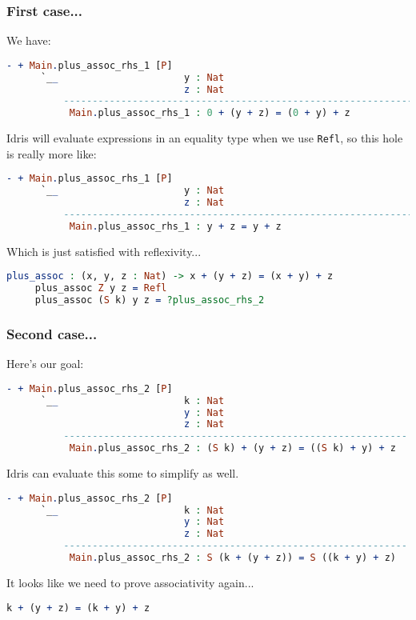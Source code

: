 \documentclass{beamer}
\begin{document}
\begin{frame}[fragile]
  \frametitle{First case...}

  We have:

  \begin{lstlisting}[language=Idris]
     - + Main.plus_assoc_rhs_1 [P]
      `__                      y : Nat
                               z : Nat
          ---------------------------------------------------------------
           Main.plus_assoc_rhs_1 : 0 + (y + z) = (0 + y) + z
  \end{lstlisting}

  \pause
  Idris will evaluate expressions in an equality type when we use
  \texttt{Refl}, so this hole is really more like:

  \begin{lstlisting}[language=Idris]
     - + Main.plus_assoc_rhs_1 [P]
      `__                      y : Nat
                               z : Nat
          ---------------------------------------------------------------
           Main.plus_assoc_rhs_1 : y + z = y + z
  \end{lstlisting}

  \pause
  Which is just satisfied with reflexivity...

  \begin{lstlisting}[language=Idris]
     plus_assoc : (x, y, z : Nat) -> x + (y + z) = (x + y) + z
     plus_assoc Z y z = Refl
     plus_assoc (S k) y z = ?plus_assoc_rhs_2
  \end{lstlisting}
\end{frame}

\begin{frame}[fragile]
  \frametitle{Second case...}

  Here's our goal:

  \begin{lstlisting}[language=Idris]
     - + Main.plus_assoc_rhs_2 [P]
      `__                      k : Nat
                               y : Nat
                               z : Nat
          ------------------------------------------------------------
           Main.plus_assoc_rhs_2 : (S k) + (y + z) = ((S k) + y) + z
  \end{lstlisting}

  \pause
  Idris can evaluate this some to simplify as well.

  \begin{lstlisting}[language=Idris]
     - + Main.plus_assoc_rhs_2 [P]
      `__                      k : Nat
                               y : Nat
                               z : Nat
          ------------------------------------------------------------
           Main.plus_assoc_rhs_2 : S (k + (y + z)) = S ((k + y) + z)
  \end{lstlisting}

  It looks like we need to prove associativity again...

  \pause
  \begin{lstlisting}[language=Idris]
    k + (y + z) = (k + y) + z
  \end{lstlisting}
\end{frame}
\end{document}
